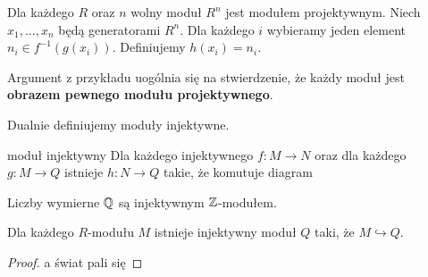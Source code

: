 \begin{example}
  Dla każdego $R$ oraz $n$ wolny moduł $R^n$ jest modułem projektywnym. Niech $x_1,..., x_n$ będą generatorami $R^n$. Dla każdego $i$ wybieramy jeden element $n_i\in f^{-1}(g(x_i))$. Definiujemy $h(x_i)=n_i$.
\end{example}

Argument z przykładu uogólnia się na stwierdzenie, że każdy moduł jest \textbf{obrazem pewnego modułu projektywnego}.

Dualnie definiujemy moduły injektywne.

\begin{definition}{moduł injektywny}{}
  Dla każdego injektywnego $f:M\to N$ oraz dla każdego $g:M\to Q$ istnieje $h:N\to Q$ takie, że komutuje diagram
  \begin{center}
  \end{center}
\end{definition}

\begin{example}
Liczby wymierne $\mathbb{Q}$ są injektywnym $\mathbb{Z}$-modułem.
\end{example}

\begin{theorem}{}{}
  Dla każdego $R$-modułu $M$ istnieje injektywny moduł $Q$ taki, że $M\hookrightarrow Q$.
\end{theorem}

\begin{proof}
  \color{red}a świat pali się 
\end{proof}



